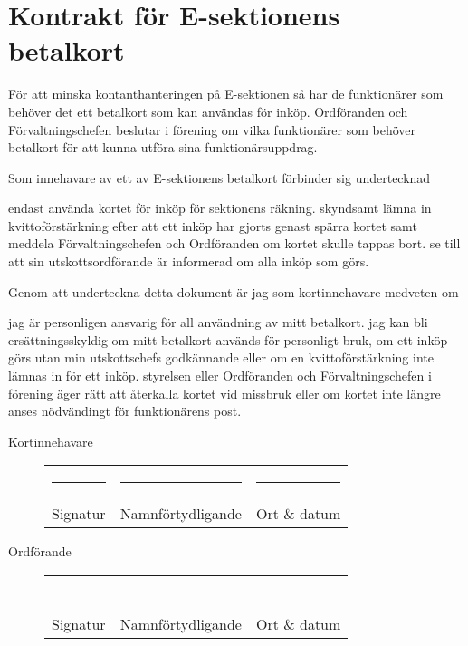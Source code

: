 \documentclass[10pt]{article}
\def\doctitle{Kontrakt för E-sektionens betalkort}
\begin{document}
\section*{\doctitle}

För att minska kontanthanteringen på E-sektionen så har de funktionärer som behöver det ett betalkort som kan användas för inköp. Ordföranden och Förvaltningschefen beslutar i förening om vilka funktionärer som behöver betalkort för att kunna utföra sina funktionärsuppdrag.

Som innehavare av ett av E-sektionens betalkort förbinder sig undertecknad

\begin{attsatser}
\att endast använda kortet för inköp för sektionens räkning.
\att skyndsamt lämna in kvittoförstärkning efter att ett inköp har gjorts
\att genast spärra kortet samt meddela Förvaltningschefen och Ordföranden om kortet skulle tappas bort.
\att se till att sin utskottsordförande är informerad om alla inköp som görs.
\end{attsatser}

Genom att underteckna detta dokument är jag som kortinnehavare medveten om
\begin{attsatser}
\att jag är personligen ansvarig för all användning av mitt betalkort.
\att jag kan bli ersättningsskyldig om mitt betalkort används för personligt bruk, om ett inköp görs utan min utskottschefs godkännande eller om en kvittoförstärkning inte lämnas in för ett inköp.
\att styrelsen eller Ordföranden och Förvaltningschefen i förening äger rätt att återkalla kortet vid missbruk eller om kortet inte längre anses nödvändingt för funktionärens post.
\end{attsatser}

\vspace*{\fill}
Kortinnehavare
\vspace*{10mm}
\begin{figure}[H]
\begin{tabularx}{\textwidth}{p{} p{} p{}}
    \rule{0.3\textwidth}{0.4pt} &
    \rule{0.3\textwidth}{0.4pt} &
    \rule{0.3\textwidth}{0.4pt} \\
    Signatur &
    Namnförtydligande &
    Ort \& datum \\
\end{tabularx}
\end{figure}

Ordförande
\vspace*{10mm}
\begin{figure}[H]
\begin{tabularx}{\textwidth}{p{} p{} p{}}
    \rule{0.3\textwidth}{0.4pt} &
    \rule{0.3\textwidth}{0.4pt} &
    \rule{0.3\textwidth}{0.4pt} \\
    Signatur &
    Namnförtydligande &
    Ort \& datum \\
\end{tabularx}
\end{figure}
\end{document}
